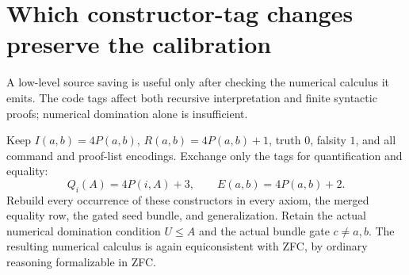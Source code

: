 \section{Which constructor-tag changes preserve the calibration}
\label{sec:constructor-tags}

A low-level source saving is useful only after checking the numerical
calculus it emits. The code tags affect both recursive interpretation
and finite syntactic proofs; numerical domination alone is insufficient.

\begin{proposition}
\label{prop:qe-tags}
Keep $I(a,b)=4P(a,b)$, $R(a,b)=4P(a,b)+1$, truth $0$, falsity $1$,
and all command and proof-list encodings. Exchange only the tags for
quantification and equality:
\[
 Q_i(A)=4P(i,A)+3,\qquad E(a,b)=4P(a,b)+2.
\]
Rebuild every occurrence of these constructors in every axiom, the
merged equality row, the gated seed bundle, and generalization.
Retain the actual numerical domination condition $U\leq A$ and the
actual bundle gate $c\ne a,b$. The resulting numerical calculus is
again equiconsistent with ZFC, by ordinary reasoning formalizable in ZFC.
\end{proposition}


